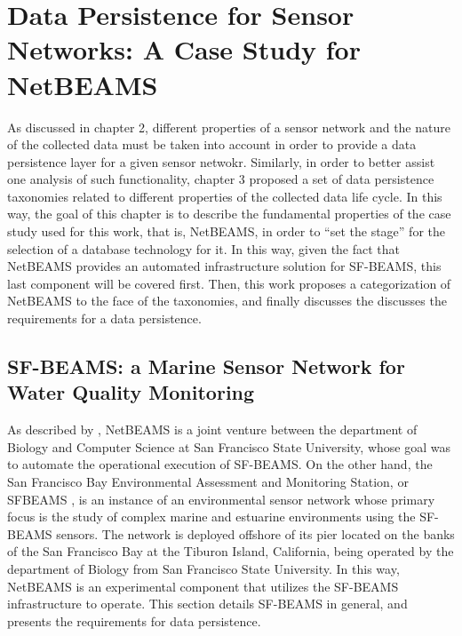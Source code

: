 

\chapter{Data Persistence for Sensor Networks: A Case Study for NetBEAMS}
\label{chap:netbeams-overview}

As discussed in chapter 2, different properties of a sensor network and the
nature of the collected data must be taken into account in order to provide a
data persistence layer for a given sensor netwokr. Similarly, in order to
better assist one analysis of such functionality, chapter 3 proposed a set of
data persistence taxonomies related to different properties of the collected
data life cycle. In this way, the goal of this chapter is to describe the
fundamental properties of the case study used for this work, that is, NetBEAMS,
in order to ``set the stage'' for the selection of a database technology for it.
In this way, given the fact that NetBEAMS provides an automated infrastructure
solution for SF-BEAMS, this last component will be covered first. Then, this
work proposes a categorization of NetBEAMS to the face of the taxonomies, and
finally discusses the discusses the requirements for a data persistence.

\section{SF-BEAMS: a Marine Sensor Network for Water Quality Monitoring}

As described by \cite{netbeams2009}, NetBEAMS is a joint venture between the
department of Biology and Computer Science at San Francisco State University,
whose goal was to automate the operational execution of SF-BEAMS. On the other
hand, the San Francisco Bay Environmental Assessment and Monitoring Station, or
SFBEAMS \cite{sfbeams2006}, is an instance of an environmental sensor
network whose primary focus is the study of complex marine and estuarine
environments using the SF-BEAMS sensors. The network is deployed offshore of
its pier located on the banks of the San Francisco Bay at the Tiburon Island,
California, being operated by the department of Biology from San Francisco
State University. In this way, NetBEAMS is an experimental component that
utilizes the SF-BEAMS infrastructure to operate. This section details SF-BEAMS
in general, and presents the requirements for data persistence.

